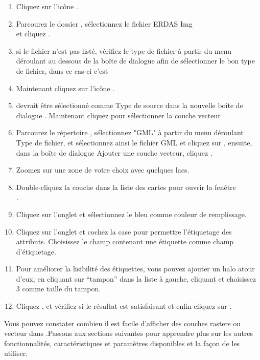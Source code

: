 {\setlength{\baselineskip}{1.3\baselineskip}
\begin{enumerate}[itemsep=2pt]
\item Cliquez sur l'icône .
\item Parcourez le dossier , sélectionnez 
le fichier ERDAS Img\\
  et cliquez .
\item si le fichier n'est pas listé, vérifiez le type de fichier à partir du menu déroulant 
au dessous de la boîte de dialogue afin de sélectionner le bon type de fichier, dans ce cas-ci c'est 
\item Maintenant cliquez sur l'icône . 
\item {} devrait être sélectionné comme Type de source dans la nouvelle boîte de dialogue 
. Maintenant cliquez  pour sélectionner la couche vecteur
\item Parcourez le répertoire , sélectionnez "GML"
à partir du menu déroulant Type de fichier, et sélectionnez ainsi le fichier GML  
et cliquez sur , ensuite, dans la boîte de dialogue Ajouter une couche vecteur, cliquez .
\item Zoomez sur une zone de votre choix avec quelques lacs.
\item Double-cliquez la couche  dans la liste des cartes pour ouvrir la fenêtre\\ .
\item Cliquez sur l'onglet  et sélectionnez le bleu comme couleur de remplissage.
\item Cliquez sur l'onglet  et cochez la case  pour permettre l'étiquetage des attributs. 
Choisissez le champ contenant une étiquette comme champ d'étiquetage.
\item Pour améliorer la lisibilité des étiquettes, vous pouvez ajouter un halo atour d'eux,
en cliquant sur ``tampon'' dans la liste à gauche, cliquant  et choisissez 3 comme taille du tampon.
\item Cliquez , et vérifiez si le résultat est satisfaisant et enfin cliquez sur .
\end{enumerate} 
\par}
Vous pouvez constater combien il est facile d'afficher des couches rasters ou vecteur dans \qg.Passons aux sections suivantes pour apprendre plus sur les autres fonctionnalités, caractéristiques et paramètres disponibles et la façon de les utiliser.